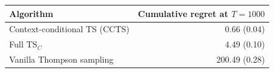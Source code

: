 \begin{tabular}{lr}
\toprule
Algorithm & Cumulative regret at $T = 1000$ \\
\midrule
Context-conditional TS (CCTS) & 0.66 (0.04) \\
Full $\mathrm{TS}_C$ \citep{bareinboim2015mabuc} & 4.49 (0.10) \\
Vanilla Thompson sampling & 200.49 (0.28) \\
\bottomrule
\end{tabular}
